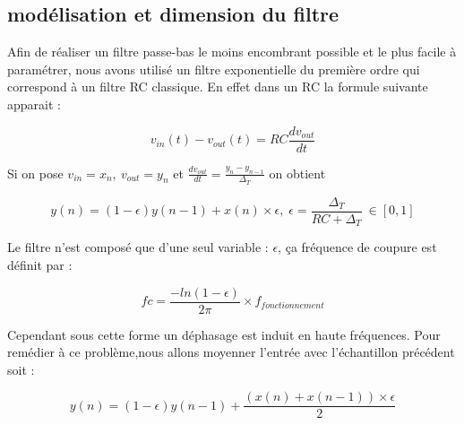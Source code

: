 \documentclass[hidelinks]{article}
\begin{document}
    \subsection{modélisation et dimension du filtre}
    Afin de réaliser un filtre passe-bas le moins encombrant possible et le plus facile à paramétrer, nous avons utilisé un filtre exponentielle du première ordre qui correspond à un filtre RC classique. En effet dans un RC la formule suivante apparait  : 
    \begin{center}
    	\begin{equation}
    	v_{in}(t)-v_{out}(t)=RC\frac{dv_{out}}{dt}
    	\end{equation}
    \end{center}
	Si on pose $v_{in}=x_n,\ v_{out}=y_n$ et $\frac{dv_{out}}{dt}=\frac{y_n-y_{n-1}}{\Delta_T}$ on obtient
	\begin{center}
		\begin{equation}
			y(n)=(1-\epsilon)y(n-1)+x(n)\times\epsilon ,\; \epsilon=\frac{\Delta_T}{RC+\Delta_T} \ \in [0,1]
		\end{equation}
	\end{center}    
    Le filtre n'est composé que d'une seul variable : $\epsilon$, ça fréquence de coupure est définit par :
    \begin{center}
    	\begin{equation}
    	fc=\frac{-ln(1-\epsilon)}{2\pi}\times f_{fonctionnement}
    	\label{fc}
    	\end{equation}
    \end{center}    
    Cependant sous cette forme un déphasage est induit en haute fréquences. Pour remédier à ce problème,nous allons moyenner l'entrée avec l'échantillon précédent soit :
	\begin{center}
		\begin{equation}
			y(n)=(1-\epsilon)y(n-1)+\frac{(x(n)+x(n-1))\times\epsilon}{2}
			\label{formule_f}
		\end{equation}
	\end{center}  
    
\end{document}
